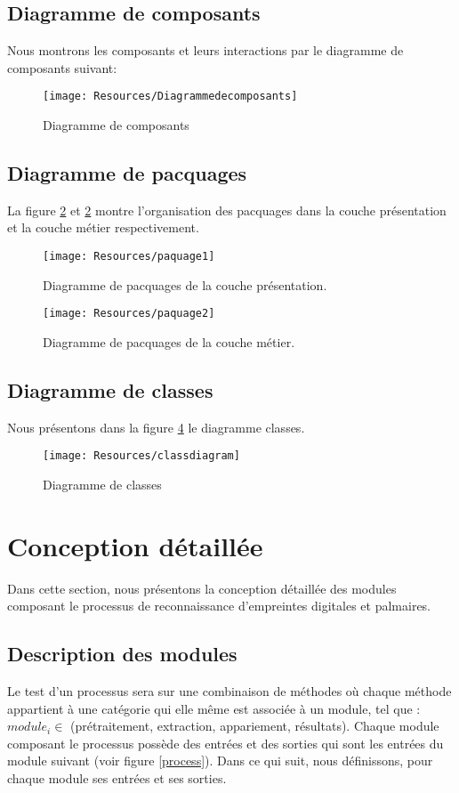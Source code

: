 \subsection{Diagramme de composants}
Nous montrons les composants et leurs interactions par le diagramme de composants suivant:
\begin{figure}[H]
	\centering
	\texttt{[image: Resources/Diagrammedecomposants]}
	\caption{Diagramme de composants}
	\label{diagramcomposants}
\end{figure}

\subsection{Diagramme de pacquages}
La figure \ref{pquage1} et \ref{pquage1} montre l'organisation des pacquages dans la couche présentation et la couche métier respectivement.
\begin{figure}[H]
	\centering
	\texttt{[image: Resources/paquage1]}
	\caption{Diagramme de pacquages de la couche présentation.}
	\label{pquage1}
\end{figure}
\begin{figure}[H]
	\centering
	\texttt{[image: Resources/paquage2]}
	\caption{Diagramme de pacquages de la couche métier.}
	\label{pquage2}
\end{figure}
\clearpage
\subsection{Diagramme de classes}
Nous présentons dans la figure \ref{classdiagram} le diagramme classes.
\begin{figure}[H]
	\centering
	\texttt{[image: Resources/classdiagram]}
	\caption{Diagramme de classes}
	\label{classdiagram}
\end{figure}
\clearpage 
\section{Conception détaillée}
Dans cette section, nous présentons la conception détaillée des modules composant le processus de reconnaissance d'empreintes digitales et palmaires. 
\subsection{Description des modules}
\label{modules}
Le test d’un processus sera sur une combinaison de méthodes où chaque méthode appartient à une catégorie qui elle même est associée à un module, tel que : $module_i \in$ (prétraitement, extraction, appariement, résultats). Chaque module composant le processus possède des entrées et des sorties qui sont les entrées du module suivant (voir figure \ref{process}). Dans ce qui suit, nous définissons, pour chaque module ses entrées et ses sorties.

